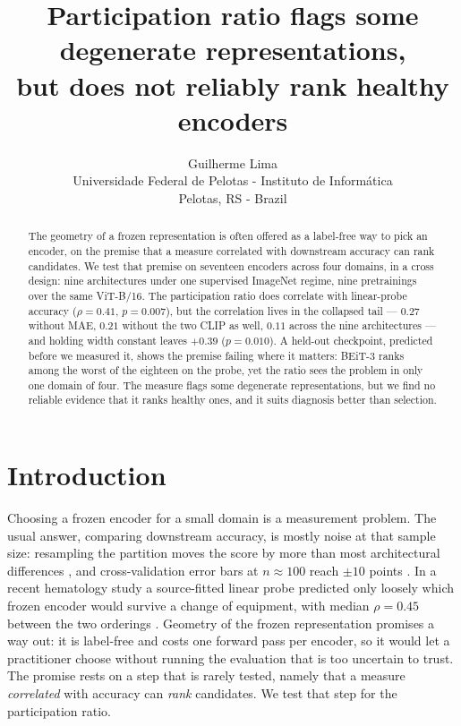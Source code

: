 \documentclass{esannV2}
\begin{document}
\title{Participation ratio flags some degenerate representations,\\but does not reliably rank healthy encoders}

\author{Guilherme Lima
\vspace{.3cm}\\
Universidade Federal de Pelotas - Instituto de Informática \\
Pelotas, RS - Brazil
}

\maketitle

\begin{abstract}
The geometry of a frozen representation is often offered as a label-free way to
pick an encoder, on the premise that a measure correlated with downstream
accuracy can rank candidates. We test that premise on seventeen encoders across
four domains, in a cross design: nine architectures under one supervised
ImageNet regime, nine pretrainings over the same ViT-B/16. The participation
ratio does correlate with linear-probe accuracy ($\rho = 0.41$, $p = 0.007$),
but the correlation lives in the collapsed tail --- $0.27$ without MAE, $0.21$
without the two CLIP as well, $0.11$ across the nine architectures --- and
holding width constant leaves $+0.39$ ($p = 0.010$). A held-out checkpoint,
predicted before we measured it, shows the premise failing where it matters:
BEiT-3 ranks among the worst of the eighteen on the probe, yet the ratio sees
the problem in only one domain of four. The measure flags some degenerate representations, but we find no reliable
evidence that it ranks healthy ones, and it suits diagnosis better than
selection.
\end{abstract}

\section{Introduction}

Choosing a frozen encoder for a small domain is a measurement problem. The
usual answer, comparing downstream accuracy, is mostly noise at that sample
size: resampling the partition moves the score by more than most architectural
differences \cite{Bouthillier}, and cross-validation error bars at $n \approx
100$ reach $\pm 10$ points \cite{Varoquaux}. In a recent hematology study a
source-fitted linear probe predicted only loosely which frozen encoder would
survive a change of equipment, with median $\rho = 0.45$ between the two
orderings \cite{Hemato}. Geometry of the frozen representation promises a way
out: it is label-free and costs one forward pass per encoder, so it would let a
practitioner choose without running the evaluation that is too uncertain to
trust. The promise rests on a step that is rarely tested, namely that a measure
\emph{correlated} with accuracy can \emph{rank} candidates. We test that step
for the participation ratio.
\end{document}
